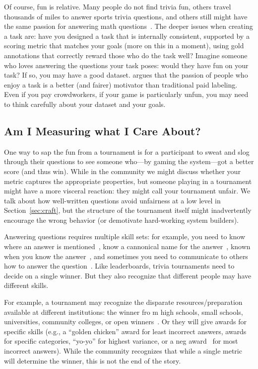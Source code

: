 Of course, fun is relative.
Many people do not find trivia fun, others travel thousands of miles to answer sports trivia questions,
and others still might have the same passion for answering math questions~\cite{amini-19}.
The deeper issues when creating a  task are:
have you designed a task that is internally consistent,
supported by a scoring metric that matches your goals (more on this in a moment),
using gold annotations that correctly reward those who do the task well?
Imagine someone who loves answering the questions your task poses: would they have fun on your task?
If so, you may have a good dataset.
 argues that the passion of people who enjoy a task is a better (and fairer) motivator than traditional paid labeling.
Even if you pay crowdworkers, if your game is particularly unfun, you may need to think carefully about your dataset and your goals.

\subsection{Am I Measuring what I Care About?}

One way to sap the fun from a tournament is for a participant to sweat and slog through their questions to see someone who---by gaming the system---got a better score (and thus win).
While in the  community we might discuss whether your metric captures the appropriate properties, but someone playing in a tournament might have a more visceral reaction: they might call your tournament unfair.
We talk about how well-written questions avoid unfairness at a low level in Section~\ref{sec:craft}, but the structure of the tournament itself might inadvertently encourage the wrong behavior (or demotivate hard-working system builders).

Answering questions requires multiple skill sets: for example, you need to know where an answer is mentioned~\cite{hermann-15}, know a cannonical name for the answer~\cite{yih-15}, known when you know the answer~\cite{rajpurkar-18}, and sometimes you need to communicate to others how to answer the question~\cite{fever-18}.
Like  leaderboards, trivia tournaments need to decide on a single winner.
But they also recognize that different people may have different skills.

For example, a tournament may recognize the disparate resources/preparation available at different institutions: the winner fro m high schools, small schools, universities, community colleges, or open winners~\cite{naqt-eligibility}.
Or they will give awards for specific skills (e.g., a ``golden chicken'' award for least incorrect answers, awards for specific categories, ``yo-yo'' for highest variance, or a neg award~\cite{neg-award} for most incorrect answers).
While the community recognizes that while a single metric will determine the winner, this is not the end of the story.

